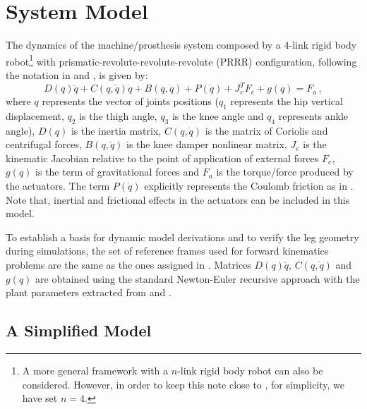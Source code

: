 \documentclass[letterpaper, 10 pt, conference]{ieeeconf}  %
\theoremstyle{plain}
\theoremstyle{definition}
\theoremstyle{remark}
\begin{document}



\section{System Model}
\label{sec:System_model}

The dynamics of the machine/prosthesis system composed by a $4$-link rigid body robot\footnote{A more general framework with a $n$-link rigid body robot can also be considered. However, in order to keep this note close to \cite{Richter2015}, for simplicity, we have set $n=4$.} with prismatic-revolute-revolute-revolute (PRRR) configuration, following the notation in \cite{Richter2015} and \cite{Fakoorian2016}, is given by:
%
\begin{equation}
D(q)\ddot{q} + C(q,\dot{q})\dot{q}+B(q,\dot{q}) + P(\dot{q}) + J_e^T F_e+g(q) = F_a\,,
\label{eq:Dinamica}
\end{equation}
%
where  $q$ represents the vector of joints positions ($q_1$ represents the hip vertical displacement, $q_2$ is the thigh angle, $q_3$ is the knee angle and $q_4$ represents ankle angle), $D(q)$ is the inertia matrix, $C(q,\dot{q})$ is the matrix of Coriolis and centrifugal forces, $B(q,\dot{q})$ is the knee  damper nonlinear matrix, $J_e$ is the kinematic Jacobian relative to the point of application of external forces $F_e$, $g(q)$ is the term of gravitational forces and $F_a$ is the torque/force produced by the actuators. The term  $P(\dot{q})$ explicitly represents the Coulomb friction as in \cite{LeeKhalil2015}. Note that, inertial and frictional effects in the actuators can be included in this model. 

To establish a basis for dynamic model derivations and to verify the leg geometry during simulations, the set of reference frames used for forward kinematics problems are the same as the ones assigned in \cite{Richter2015}. Matrices $D(q)\ddot{q}$, $C(q,\dot{q})$ and $g(q)$ are obtained using the standard Newton-Euler recursive approach with the plant parameters extracted from \cite{Richter2015} and \cite{Fakoorian2016}.

\subsection{A Simplified Model}
\end{document}
